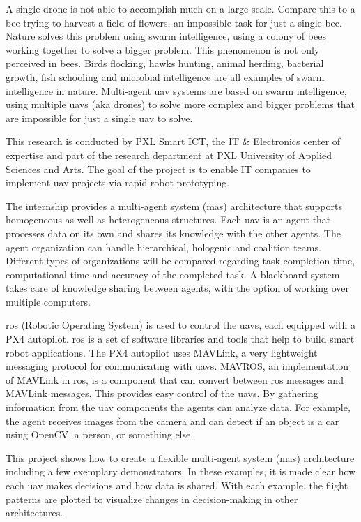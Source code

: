 A single drone is not able to accomplish much on a large scale. Compare this to a bee trying to harvest a 
field of flowers, an impossible task for just a single bee. Nature solves this problem using swarm intelligence, 
using a colony of bees working together to solve a bigger problem. This phenomenon is not only perceived in bees. Birds flocking, 
hawks hunting, animal herding, bacterial growth, fish schooling and microbial intelligence are all examples 
of swarm intelligence in nature. Multi-agent \acs{uav} systems are based on swarm intelligence, using multiple 
\acsp{uav} (aka drones) to solve more complex and bigger problems that are impossible for just a single \acs{uav} to solve.

This research is conducted by PXL Smart ICT, the IT \& Electronics center of expertise and part of the research 
department at PXL University of Applied Sciences and Arts. The goal of the project is to enable IT companies to 
implement \acs{uav} projects via rapid robot prototyping.

The internship provides a multi-agent system (\acs{mas}) architecture that supports homogeneous as well as heterogeneous 
structures. Each \acs{uav} is an agent that processes data on its own and shares its knowledge with the other agents. 
The agent organization can handle hierarchical, hologenic and coalition teams. Different types of organizations will 
be compared regarding task completion time, computational time and accuracy of the completed task. A blackboard system 
takes care of knowledge sharing between agents, with the option of working over multiple computers. 

\acs{ros} (Robotic Operating System) is used to control the \acsp{uav}, each equipped with a PX4 autopilot. \acs{ros} is a set of 
software libraries and tools that help to build smart robot applications. The PX4 autopilot uses MAVLink, a very 
lightweight messaging protocol for communicating with \acsp{uav}. MAVROS, an implementation of MAVLink in \acs{ros}, is a 
component that can convert between \acs{ros} messages and MAVLink messages. This provides easy control of the \acsp{uav}. By 
gathering information from the \acs{uav} components the agents can analyze data. For example, the agent receives images 
from the camera and can detect if an object is a car using OpenCV, a person, or something else.

This project shows how to create a flexible multi-agent system (\acs{mas}) architecture including a few exemplary 
demonstrators. In these examples, it is made clear how each \acs{uav} makes decisions and how data is shared. 
With each example, the flight patterns are plotted to visualize changes in decision-making in other architectures.
